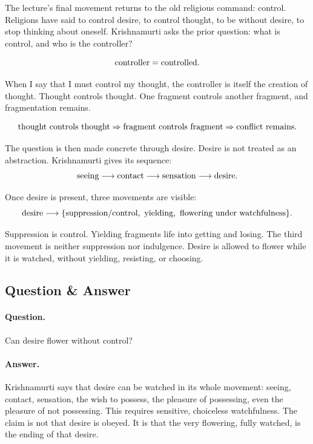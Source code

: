 \documentclass[11pt,oneside]{book}
\begin{document}
The lecture's final movement returns to the old religious command: control. Religions have said to control desire, to control thought, to be without desire, to stop thinking about oneself. Krishnamurti asks the prior question: what is control, and who is the controller?

\begin{equation}
\hbox{controller}=\hbox{controlled}.
\end{equation}

When I say that I must control my thought, the controller is itself the creation of thought. Thought controls thought. One fragment controls another fragment, and fragmentation remains.

\begin{equation}
\hbox{thought controls thought}
\Rightarrow
\hbox{fragment controls fragment}
\Rightarrow
\hbox{conflict remains}.
\end{equation}

The question is then made concrete through desire. Desire is not treated as an abstraction. Krishnamurti gives its sequence:
\begin{equation}
\hbox{seeing}
\longrightarrow
\hbox{contact}
\longrightarrow
\hbox{sensation}
\longrightarrow
\hbox{desire}.
\end{equation}

Once desire is present, three movements are visible:
\begin{equation}
\hbox{desire}
\longrightarrow
\{\hbox{suppression/control},\ \hbox{yielding},\ \hbox{flowering under watchfulness}\}.
\end{equation}

Suppression is control. Yielding fragments life into getting and losing. The third movement is neither suppression nor indulgence. Desire is allowed to flower while it is watched, without yielding, resisting, or choosing.

\subsection{Question \& Answer}

\paragraph{Question.}
Can desire flower without control?

\paragraph{Answer.}
Krishnamurti says that desire can be watched in its whole movement: seeing, contact, sensation, the wish to possess, the pleasure of possessing, even the pleasure of not possessing. This requires sensitive, choiceless watchfulness. The claim is not that desire is obeyed. It is that the very flowering, fully watched, is the ending of that desire.
\end{document}
